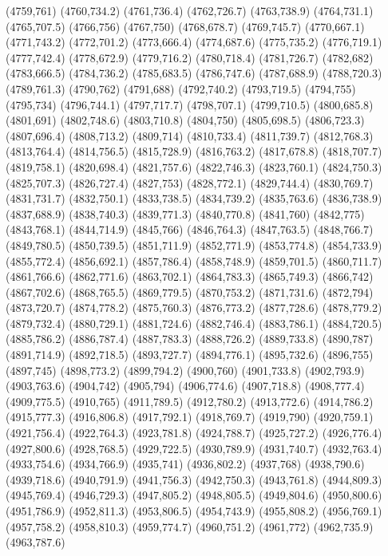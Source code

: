 (4759,761)
(4760,734.2)
(4761,736.4)
(4762,726.7)
(4763,738.9)
(4764,731.1)
(4765,707.5)
(4766,756)
(4767,750)
(4768,678.7)
(4769,745.7)
(4770,667.1)
(4771,743.2)
(4772,701.2)
(4773,666.4)
(4774,687.6)
(4775,735.2)
(4776,719.1)
(4777,742.4)
(4778,672.9)
(4779,716.2)
(4780,718.4)
(4781,726.7)
(4782,682)
(4783,666.5)
(4784,736.2)
(4785,683.5)
(4786,747.6)
(4787,688.9)
(4788,720.3)
(4789,761.3)
(4790,762)
(4791,688)
(4792,740.2)
(4793,719.5)
(4794,755)
(4795,734)
(4796,744.1)
(4797,717.7)
(4798,707.1)
(4799,710.5)
(4800,685.8)
(4801,691)
(4802,748.6)
(4803,710.8)
(4804,750)
(4805,698.5)
(4806,723.3)
(4807,696.4)
(4808,713.2)
(4809,714)
(4810,733.4)
(4811,739.7)
(4812,768.3)
(4813,764.4)
(4814,756.5)
(4815,728.9)
(4816,763.2)
(4817,678.8)
(4818,707.7)
(4819,758.1)
(4820,698.4)
(4821,757.6)
(4822,746.3)
(4823,760.1)
(4824,750.3)
(4825,707.3)
(4826,727.4)
(4827,753)
(4828,772.1)
(4829,744.4)
(4830,769.7)
(4831,731.7)
(4832,750.1)
(4833,738.5)
(4834,739.2)
(4835,763.6)
(4836,738.9)
(4837,688.9)
(4838,740.3)
(4839,771.3)
(4840,770.8)
(4841,760)
(4842,775)
(4843,768.1)
(4844,714.9)
(4845,766)
(4846,764.3)
(4847,763.5)
(4848,766.7)
(4849,780.5)
(4850,739.5)
(4851,711.9)
(4852,771.9)
(4853,774.8)
(4854,733.9)
(4855,772.4)
(4856,692.1)
(4857,786.4)
(4858,748.9)
(4859,701.5)
(4860,711.7)
(4861,766.6)
(4862,771.6)
(4863,702.1)
(4864,783.3)
(4865,749.3)
(4866,742)
(4867,702.6)
(4868,765.5)
(4869,779.5)
(4870,753.2)
(4871,731.6)
(4872,794)
(4873,720.7)
(4874,778.2)
(4875,760.3)
(4876,773.2)
(4877,728.6)
(4878,779.2)
(4879,732.4)
(4880,729.1)
(4881,724.6)
(4882,746.4)
(4883,786.1)
(4884,720.5)
(4885,786.2)
(4886,787.4)
(4887,783.3)
(4888,726.2)
(4889,733.8)
(4890,787)
(4891,714.9)
(4892,718.5)
(4893,727.7)
(4894,776.1)
(4895,732.6)
(4896,755)
(4897,745)
(4898,773.2)
(4899,794.2)
(4900,760)
(4901,733.8)
(4902,793.9)
(4903,763.6)
(4904,742)
(4905,794)
(4906,774.6)
(4907,718.8)
(4908,777.4)
(4909,775.5)
(4910,765)
(4911,789.5)
(4912,780.2)
(4913,772.6)
(4914,786.2)
(4915,777.3)
(4916,806.8)
(4917,792.1)
(4918,769.7)
(4919,790)
(4920,759.1)
(4921,756.4)
(4922,764.3)
(4923,781.8)
(4924,788.7)
(4925,727.2)
(4926,776.4)
(4927,800.6)
(4928,768.5)
(4929,722.5)
(4930,789.9)
(4931,740.7)
(4932,763.4)
(4933,754.6)
(4934,766.9)
(4935,741)
(4936,802.2)
(4937,768)
(4938,790.6)
(4939,718.6)
(4940,791.9)
(4941,756.3)
(4942,750.3)
(4943,761.8)
(4944,809.3)
(4945,769.4)
(4946,729.3)
(4947,805.2)
(4948,805.5)
(4949,804.6)
(4950,800.6)
(4951,786.9)
(4952,811.3)
(4953,806.5)
(4954,743.9)
(4955,808.2)
(4956,769.1)
(4957,758.2)
(4958,810.3)
(4959,774.7)
(4960,751.2)
(4961,772)
(4962,735.9)
(4963,787.6)
